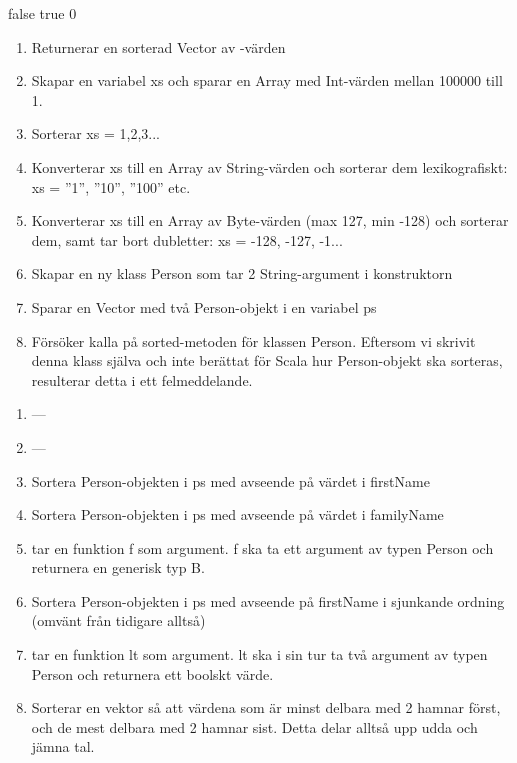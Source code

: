 \Subtask
\begin{REPLnonum}
false
true
0
\end{REPLnonum}


\Task %

\Subtask
\begin{enumerate}
\item Returnerar en sorterad Vector av -värden
\item Skapar en variabel xs och sparar en Array med Int-värden mellan 100000 till 1.
\item Sorterar xs = 1,2,3...
\item Konverterar xs till en Array av String-värden och sorterar dem lexikografiskt: xs = ”1”, ”10”, ”100” etc.
\item Konverterar xs till en Array av Byte-värden (max 127, min -128) och sorterar dem, samt tar bort dubletter: xs = -128, -127, -1...
\item Skapar en ny klass Person som tar 2 String-argument i konstruktorn
\item Sparar en Vector med två Person-objekt i en variabel ps
\item Försöker kalla på sorted-metoden för klassen Person. Eftersom vi skrivit denna klass själva och inte berättat för Scala hur Person-objekt ska sorteras, resulterar detta i ett felmeddelande.
\end{enumerate}

\Subtask 

\begin{enumerate}
\item ---
\item ---
\item Sortera Person-objekten i ps med avseende på värdet i firstName
\item Sortera Person-objekten i ps med avseende på värdet i familyName 
\item {} tar en funktion f som argument. f ska ta ett argument av typen Person och returnera en generisk typ B.
\item Sortera Person-objekten i ps med avseende på firstName i sjunkande ordning (omvänt från tidigare alltså)
\item {} tar en funktion lt som argument. lt ska i sin tur ta två argument av typen Person och returnera ett boolskt värde.
\item Sorterar en vektor så att värdena som är minst delbara med 2 hamnar först, och de mest delbara med 2 hamnar sist. Detta delar alltså upp udda och jämna tal.
\end{enumerate}

